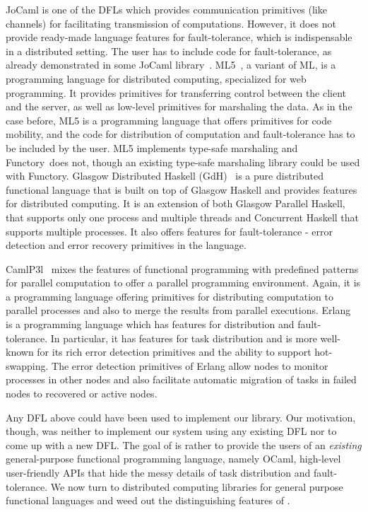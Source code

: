\documentclass{llncs}
\newcommand{\Ocaml}{OCaml}
\newcommand{\functory}{\textsf{Functory}}
\begin{document}
JoCaml is one of the DFLs which provides communication primitives
(like channels) for facilitating transmission of
computations. However, it does not provide ready-made language
features for fault-tolerance, which is indispensable in a distributed
setting. The user has to include code for fault-tolerance, as already
demonstrated in some JoCaml
library~\cite{mandel2008}. ML5~\cite{ML5}, a variant of ML, is a
programming language for distributed computing, specialized for web
programming. It provides primitives for transferring control between
the client and the server, as well as low-level primitives for
marshaling the data. As in the case before, ML5 is a programming
language that offers primitives for code mobility, and the code for
distribution of computation and fault-tolerance has to be included by
the user.  ML5 implements type-safe marshaling and
\functory\ does not, though an existing type-safe marshaling library
could be used with \functory. 
Glasgow Distributed Haskell (GdH)~\cite{GdH} is a pure distributed
functional language that is built on top of Glasgow Haskell and
provides features for distributed computing. It is an extension of
both Glasgow Parallel Haskell, that supports only one process and
multiple threads and Concurrent Haskell that supports multiple
processes. It also offers features for fault-tolerance - error
detection and error recovery primitives in the
language. 

CamlP3l~\cite{camlP3l} mixes the features of functional programming
with predefined patterns for parallel computation to offer a parallel
programming environment. Again, it is a programming language offering
primitives for distributing computation to parallel processes and also
to merge the results from parallel executions. Erlang~\cite{erlang} is
a programming language which has features for distribution and 
fault-tolerance. In particular, it has features for task distribution and is
more well-known for its rich error detection primitives and the
ability to support hot-swapping. The error detection primitives of
Erlang allow nodes to monitor processes in other nodes and also
facilitate automatic migration of tasks in failed nodes to recovered
or active nodes.

Any DFL above could have been used to implement our library. 
Our motivation, though, was neither to implement our system using any
existing DFL nor to come up with a new DFL.
The goal of  is rather to provide the
users of an \emph{existing} general-purpose functional programming
language, namely \Ocaml, high-level 
user-friendly APIs that hide the messy details of task distribution
and fault-tolerance.
We now turn to distributed computing libraries for general purpose
functional languages and weed out the distinguishing features of
.
\end{document}
